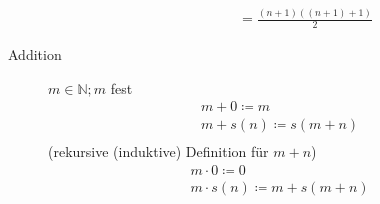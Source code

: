 \begin{description}
\begin{description}
\begin{align*}
            & = \frac{(n + 1)((n + 1)+1)}{2}
        \end{align*}
    \end{description}
    \item[Addition] $m \in \mathbb{N}; m$ fest
    \begin{gather*}
        m+0\coloneqq m\\
        m + s(n) \coloneqq s(m + n)\\
    \end{gather*}
    (rekursive (induktive) Definition für $m + n$)
    \begin{gather*}
        m \cdot 0\coloneqq 0\\
        m \cdot s(n) \coloneqq m + s(m + n)\\
    \end{gather*}
\end{description}
